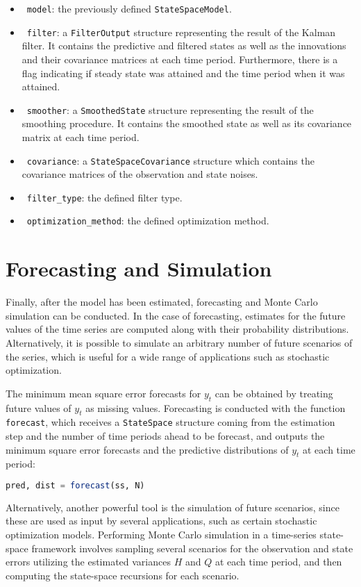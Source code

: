 \documentclass{juliacon}
\begin{document}
\begin{itemize}
    \item ~\texttt{model}: the previously defined \texttt{StateSpaceModel}.
    \item ~\texttt{filter}: a \texttt{FilterOutput} structure representing the result of the Kalman filter. It contains the predictive and filtered states as well as the innovations and their covariance matrices at each time period. Furthermore, there is a flag indicating if steady state was attained and the time period when it was attained.
    \item ~\texttt{smoother}: a \texttt{SmoothedState} structure representing the result of the smoothing procedure. It contains the smoothed state as well as its covariance matrix at each time period.
    \item ~\texttt{covariance}: a \texttt{StateSpaceCovariance} structure which contains the covariance matrices of the observation and state noises.
    \item ~\texttt{filter\_type}: the defined filter type.
    \item ~\texttt{optimization\_method}: the defined optimization method.
\end{itemize}

\section{Forecasting and Simulation} \label{sec:forecasting}

Finally, after the model has been estimated, forecasting and Monte Carlo simulation can be conducted. In the case of forecasting, estimates for the future values of the time series are computed along with their probability distributions. Alternatively, it is possible to simulate an arbitrary number of future scenarios of the series, which is useful for a wide range of applications such as stochastic optimization.

The minimum mean square error forecasts for $y_{t}$ can be obtained by treating future values of $y_{t}$ as missing values. Forecasting is conducted with the function \texttt{forecast}, which receives a \texttt{StateSpace} structure coming from the estimation step and the number of time periods ahead to be forecast, and outputs the minimum square error forecasts and the predictive distributions of $y_{t}$ at each time period:
%
\begin{lstlisting}[language = Julia]
pred, dist = forecast(ss, N)
\end{lstlisting}
%
Alternatively, another powerful tool is the simulation of future scenarios, since these are used as input by several applications, such as certain stochastic optimization models. Performing Monte Carlo simulation in a time-series state-space framework involves sampling several scenarios for the observation and state errors utilizing the estimated variances $H$ and $Q$ at each time period, and then computing the state-space recursions for each scenario.
\end{document}
